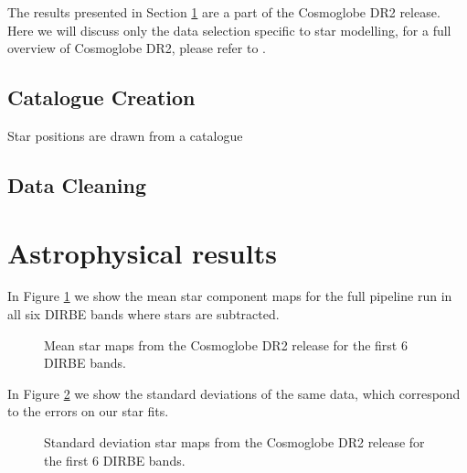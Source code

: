\documentclass{aa}
\begin{document}
The results presented in Section \ref{sec:results} are a part of the Cosmoglobe DR2 release. Here we will discuss only the data selection specific to star modelling, for a full overview of Cosmoglobe DR2, please refer to  \cite{CG02_01}.

\subsection{Catalogue Creation}
\label{sec:catalogue}

Star positions are drawn from a catalogue 

\subsection{Data Cleaning}



\clearpage
\section{Astrophysical results}
\label{sec:results}

In Figure \ref{fig:stars} we show the mean star component maps for the full pipeline run in all six DIRBE bands where stars are subtracted. 

\begin{figure}
  \centering
  \caption{Mean star maps from the Cosmoglobe DR2 release for the first 6 DIRBE bands. }
  \label{fig:stars}
\end{figure}

In Figure \ref{fig:std} we show the standard deviations of the same data, which correspond to the errors on our star fits. 

\begin{figure}
  \centering
  \caption{Standard deviation star maps from the Cosmoglobe DR2 release for the first 6 DIRBE bands. }
  \label{fig:std}
\end{figure}
\end{document}
